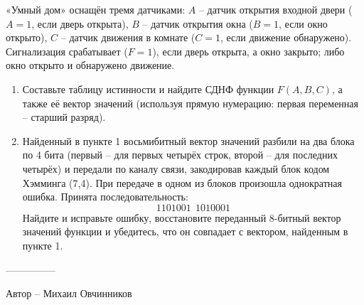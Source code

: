\question
«Умный дом» оснащён тремя датчиками: $A$ -- датчик открытия входной двери ($A=1$, если дверь открыта), $B$ -- датчик открытия окна ($B=1$, если окно открыто), $C$ -- датчик движения в комнате ($C=1$, если движение обнаружено). Сигнализация срабатывает ($F=1$), если дверь открыта, а окно закрыто; либо окно открыто и обнаружено движение.

\begin{enumerate}
\item Составьте таблицу истинности и найдите СДНФ функции $F(A,B,C)$, а также её вектор значений (используя прямую нумерацию: первая переменная -- старший разряд).
\item Найденный в пункте 1 восьмибитный вектор значений разбили на два блока по 4 бита (первый -- для первых четырёх строк, второй -- для последних четырёх) и передали по каналу связи, закодировав каждый блок кодом Хэмминга (7,4). При передаче в одном из блоков произошла однократная ошибка. Принята последовательность:
\[
1101001\ \ 1010001
\]
Найдите и исправьте ошибку, восстановите переданный 8-битный вектор значений функции и убедитесь, что он совпадает с вектором, найденным в пункте 1.
\end{enumerate}
---------------

Автор -- Михаил Овчинников